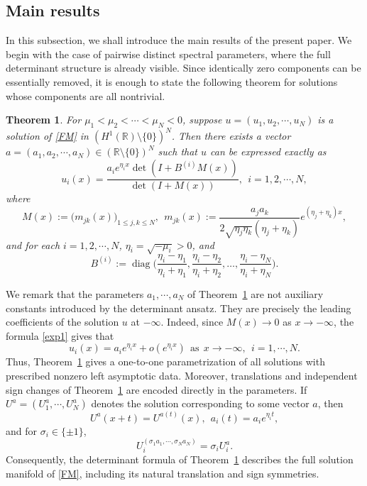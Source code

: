 \documentclass[11pt]{article}
\numberwithin{equation}{section}
\newtheorem{theorem}{Theorem}[section]
\newcommand{\R}{{\mathbb{R}}}
\theoremstyle{definition}
\newtheorem{remark}{Remark}[section]
\begin{document}
\subsection{Main results}

In this subsection, we shall introduce the main results of the present paper. We begin with the case of pairwise distinct spectral parameters, where the
full determinant structure is already visible.  Since identically zero
components can  be essentially removed, it is enough to state the following theorem for
solutions whose components are all nontrivial.

\begin{theorem}\label{thm1.1}
For $\mu_1<\mu_2<\cdots<\mu_N<0$, suppose $u=(u_1,u_2,\cdots,u_N)$ is a  solution of \eqref{FM} in $(H^1(\R)\setminus\{0\})^N$. Then there exists a vector $a=(a_1,a_2,\cdots,a_N)\in(\R\setminus\{0\})^N$ such that $u$ can be expressed exactly as
\begin{equation}\label{exp1}
	u_i(x)=\frac{a_ie^{\eta_ix}\det(I+B^{(i)}M(x))}{\det(I+M(x))},\ \ i=1,2,\cdots,N,
\end{equation}
where
\begin{equation}\label{MatrixM}
M(x):=\bigl(m_{jk}(x)\bigr)_{1\le j,k\le N},
\ \
m_{jk}(x):=\frac{a_j a_k}{2\sqrt{\eta_j\eta_k}(\eta_j+\eta_k)}e^{(\eta_j+\eta_k)x},
\end{equation}
and for each $i=1,2,\cdots,N$,  $\eta_i=\sqrt{-\mu_i}>0$, and
\begin{equation}\label{Bi}
B^{(i)}:=\operatorname{diag}\Big(
\frac{\eta_i-\eta_1}{\eta_i+\eta_1},
\frac{\eta_i-\eta_2}{\eta_i+\eta_2},
\dots,
\frac{\eta_i-\eta_N}{\eta_i+\eta_N}
\Big).
\end{equation}
\end{theorem}



We remark that the parameters \(a_1,\cdots,a_N\) of Theorem~\ref{thm1.1} are not
auxiliary constants introduced by the determinant ansatz. They are precisely
the leading coefficients of the solution $u$ at \(-\infty\). Indeed, since
\(M(x)\to0\) as \(x\to-\infty\), the formula \eqref{exp1} gives that
\[
u_i(x)=a_i e^{\eta_i x}+o(e^{\eta_i x})
\ \ \mbox{as}\ \  x\to-\infty,\ \ i=1,\cdots,N .
\]
Thus, Theorem~\ref{thm1.1} gives a one-to-one parametrization of all
solutions with prescribed nonzero left asymptotic data. Moreover, translations and independent sign changes of Theorem~\ref{thm1.1} are encoded directly in
the parameters. If \(U^a=(U_1^a, \cdots, U_N^a)\) denotes the solution corresponding to some vector \(a\), then
\[
U^a(x+t)=U^{a(t)}(x),
\ \
a_i(t)=a_i e^{\eta_i t},
\]
and for \(\sigma_i\in\{\pm1\}\),
\[
U^{(\sigma_1a_1,\cdots,\sigma_Na_N)}_i
=
\sigma_i U^a_i .
\]
Consequently, the determinant formula of Theorem~\ref{thm1.1} describes the full solution manifold of \eqref{FM},
including its natural translation and sign symmetries.
\end{document}
